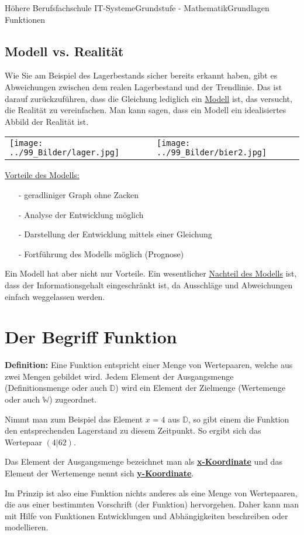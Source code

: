 \documentclass[11pt,twocolumn,oneside,openany,headings=optiontotoc,11pt,numbers=noenddot]{article}
\begin{document}
\begin{worksheet}{Höhere Berufsfachschule IT-Systeme}{Grundstufe - Mathematik}{Grundlagen Funktionen}
		\subsection{Modell vs. Realität}
		Wie Sie am Beispiel des Lagerbestands sicher bereits erkannt haben, gibt es Abweichungen zwischen dem realen Lagerbestand und der Trendlinie. Das ist darauf zurückzuführen, dass die Gleichung lediglich ein \underline{Modell} ist, das versucht, die Realität zu vereinfachen. Man kann sagen, dass ein Modell ein idealisiertes Abbild der Realität ist.\\
		\par\bigskip\noindent
		\begin{tabularx}{0.45\textwidth}{XX}
			\texttt{[image: ../99\_Bilder/lager.jpg]} & \texttt{[image: ../99\_Bilder/bier2.jpg]}
		\end{tabularx}
		\par\bigskip\noindent
		\underline{Vorteile des Modells:}
		\begin{itemize}
			\item[-] geradliniger Graph ohne Zacken
			\item[-] Analyse der Entwicklung möglich
			\item[-] Darstellung der Entwicklung mittels einer Gleichung
			\item[-] Fortführung des Modells möglich (Prognose)
		\end{itemize}
		Ein Modell hat aber nicht nur Vorteile. Ein wesentlicher \underline{Nachteil des Modells} ist, dass der Informationsgehalt eingeschränkt ist, da Ausschläge und Abweichungen einfach weggelassen werden.
		\newpage
		\section{Der Begriff \glqq{}Funktion\grqq{}}
		\begin{framed}
			\noindent
			\textbf{Definition:} Eine Funktion entspricht einer Menge von Wertepaaren, welche aus zwei Mengen gebildet wird. Jedem Element der Ausgangsmenge (Definitionsmenge oder auch \(\mathbb{D}\)) wird ein Element der Zielmenge (Wertemenge oder auch \(\mathbb{W}\)) zugeordnet.
		\end{framed}
		\noindent
		Nimmt man zum Beispiel das Element \(x=4\) aus \(\mathbb{D}\), so gibt einem die Funktion den entsprechenden Lagerstand zu diesem Zeitpunkt. So ergibt sich das Wertepaar \((4|62)\).\\
		\par\bigskip\noindent
		Das Element der Ausgangsmenge bezeichnet man als \underline{\textbf{x-Koordinate}} und das Element der Wertemenge nennt sich \underline{\textbf{y-Koordinate}}.\\
		\par\bigskip\noindent
		Im Prinzip ist also eine Funktion nichts anderes als eine Menge von Wertepaaren, die aus einer bestimmten Vorschrift (der Funktion) hervorgehen. Daher kann man mit Hilfe von Funktionen Entwicklungen und Abhängigkeiten beschreiben oder modellieren.

\end{worksheet}
\end{document}
